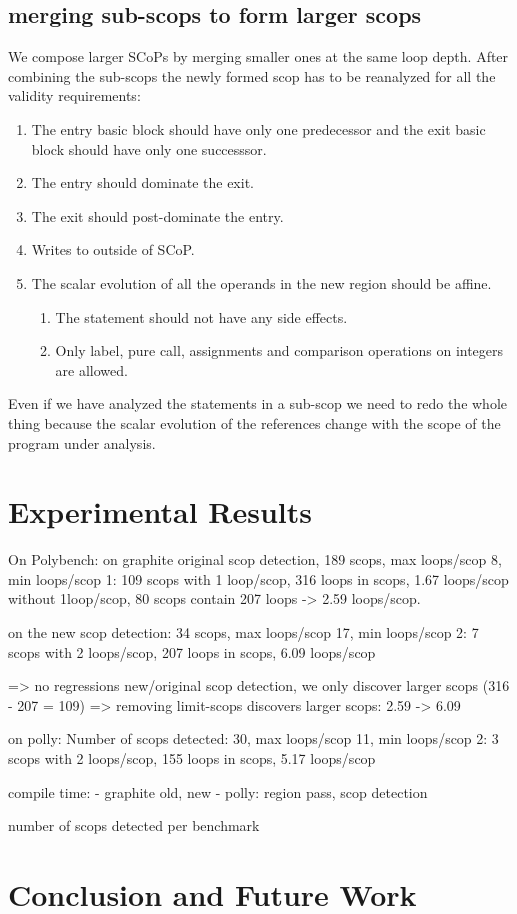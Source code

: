 \documentclass{sigplanconf}
\begin{document}
\subsection{merging sub-scops to form larger scops}
We compose larger SCoPs by merging smaller ones at the same loop depth. After combining the sub-scops
the newly formed scop has to be reanalyzed for all the validity requirements:
\begin{enumerate}
  \item The entry basic block should have only one predecessor and the exit basic block should have only one
    successsor.
  \item The entry should dominate the exit.
  \item The exit should post-dominate the entry.
  \item Writes to outside of SCoP.
  \item The scalar evolution of all the operands in the new region should be affine.

    \begin{enumerate}
      \item The statement should not have any side effects.
      \item Only label, pure call, assignments and comparison operations on integers are allowed.
    \end{enumerate}
\end{enumerate}

Even if we have analyzed the statements in a sub-scop we need to redo the whole thing because the scalar evolution
of the references change with the scope of the program under analysis.


\section{Experimental Results}

On Polybench:
on graphite original scop detection, 189 scops, max loops/scop 8, min loops/scop 1: 109 scops with 1 loop/scop, 316 loops in scops, 1.67 loops/scop
without 1loop/scop, 80 scops contain 207 loops -> 2.59 loops/scop.

on the new scop detection: 34 scops, max loops/scop 17, min loops/scop 2: 7 scops with 2 loops/scop, 207 loops in scops, 6.09 loops/scop

=> no regressions new/original scop detection, we only discover larger scops (316 - 207 = 109)
=> removing limit-scops discovers larger scops: 2.59 -> 6.09

on polly: Number of scops detected: 30, max loops/scop 11, min loops/scop 2: 3 scops with 2 loops/scop, 155 loops in scops, 5.17 loops/scop


compile time:
- graphite old, new
- polly: region pass, scop detection

number of scops detected per benchmark


\section{Conclusion and Future Work}



{\small

}
\end{document}
